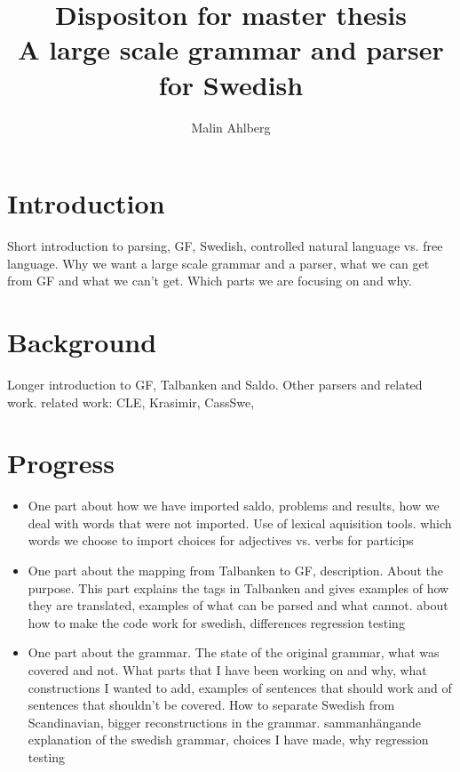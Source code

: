 \documentclass{article}
\begin{document}
\title{Dispositon for master thesis \\
             \small{A large scale grammar and parser for Swedish}}
\author{Malin Ahlberg}
\maketitle

\section{Introduction} 
Short introduction to parsing, GF, Swedish, controlled natural language vs.
free language.
Why we want a large scale grammar and a parser, what we can get from GF and
what we can't get. Which parts we are focusing on and why.

\section{Background}  
Longer introduction to GF, Talbanken and Saldo. Other parsers and related work.
related work: CLE, Krasimir, CassSwe,

\section{Progress}  
\begin{itemize}
\item{
One part about how we have imported saldo, problems and results, how we deal
with words that were not imported. Use of lexical aquisition tools. 
which words we choose to import
choices for adjectives vs. verbs for particips
}
\item{
One part about the mapping from Talbanken to GF, description. About the purpose.
This part explains
the tags in Talbanken and gives examples of how they are translated,
examples of what can be parsed and what cannot.
about how to make the code work for swedish, differences
regression testing
}
\item{
One part about the grammar. The state of the original grammar, what was covered and not. 
What parts that I have been working on and why, 
what constructions I wanted to add, examples of sentences that should work
and of sentences that shouldn't be covered. How to separate Swedish from
Scandinavian, bigger reconstructions in the grammar. 
sammanhängande explanation of the swedish grammar, choices I have made, why
regression testing
}
\end{itemize}
\end{document}
